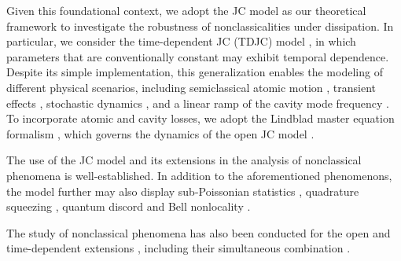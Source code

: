 \documentclass[aps,pre,superscriptaddress,twocolumn,10pt]{revtex4-2}
\begin{document}
Given this foundational context, we adopt the JC model as our theoretical framework to investigate the robustness of nonclassicalities under dissipation.
In particular, we consider the time-dependent JC (TDJC) model \cite{DeCastro2023,LARSON2021,Tsutsui2026}, in which parameters that are conventionally constant may exhibit temporal dependence.
Despite its simple implementation, this generalization enables the modeling of different physical scenarios, including semiclassical atomic motion \cite{Schlicher1989,Fang1998}, transient effects \cite{Dasgupta1999,Prants1992}, 
stochastic dynamics \cite{Joshi1995}, and a linear ramp of the cavity mode frequency \cite{Joshi1993}. 
To incorporate atomic and cavity losses, we adopt the Lindblad master equation formalism \cite{Lindblad1976,Manzano2020}, which governs the dynamics of the open JC model \cite{Barnett1986,Puri1988}.

The use of the JC model and its extensions in the analysis of nonclassical phenomena is well-established. 
In addition to the aforementioned phenomenons, the model further may also display sub-Poissonian statistics \cite{Hillery1987,Chumakov1993}, quadrature squeezing \cite{Kuklinski1988,Hillery1989}, quantum discord \cite{Mirmasoudi2018} and Bell nonlocality \cite{Bernal2025}.


The study of nonclassical phenomena has also been conducted for the open \cite{Clemens2000,Rendell2003,Smirne2010,Mohamed2019,Mohamed2025} and time-dependent extensions \cite{Fang1998,Joshi1993,Chao2010,Hu2014,Abdel-Khalek2016a}, including their simultaneous combination \cite{Abdel-Khalek2016a,Kolar2024}. 
\end{document}
